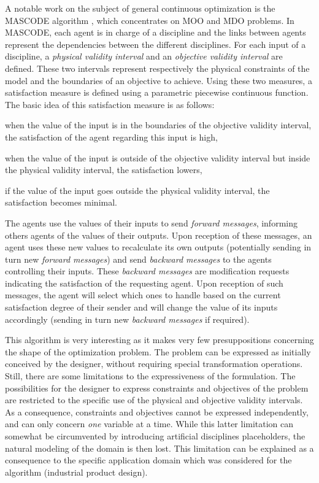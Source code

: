 A notable work on the subject of general continuous optimization is the MASCODE algorithm \cite{welcomme2006self}, which concentrates on MOO and MDO problems. In MASCODE, each agent is in charge of a discipline and the links between agents represent the dependencies between the different disciplines. For each input of a discipline, a \emph{physical validity interval} and an \emph{objective validity interval} are defined. These two intervals represent respectively the physical constraints of the model and the boundaries of an objective to achieve. Using these two measures, a satisfaction measure is defined using a parametric piecewise continuous function. The basic idea of this satisfaction measure is as follows: 
\begin{compactitem}
\item when the value of the input is in the boundaries of the objective validity interval, the satisfaction of the agent regarding this input is high,
\item when the value of the input is outside of the objective validity interval but inside the physical validity interval, the satisfaction lowers,
\item if the value of the input goes outside the physical validity interval, the satisfaction becomes minimal.
\end{compactitem}

The agents use the values of their inputs to send \emph{forward messages}, informing others agents of the values of their outputs. Upon reception of these messages, an agent uses these new values to recalculate its own outputs (potentially sending in turn new \emph{forward messages}) and send \emph{backward messages} to the agents controlling their inputs. These \emph{backward messages} are modification requests indicating the satisfaction of the requesting agent. Upon reception of such messages, the agent will select which ones to handle based on the current satisfaction degree of their sender and will change the value of its inputs accordingly (sending in turn new \emph{backward messages} if required).

This algorithm is very interesting as it makes very few presuppositions concerning the shape of the optimization problem. The problem can be expressed as initially conceived by the designer, without requiring special transformation operations. Still, there are some limitations to the expressiveness of the formulation. The possibilities for the designer to express constraints and objectives of the problem are restricted to the specific use of the physical and objective validity intervals. As a consequence, constraints and objectives cannot be expressed independently, and can only concern \emph{one} variable at a time. While this latter limitation can somewhat be circumvented by introducing artificial disciplines placeholders, the natural modeling of the domain is then lost. This limitation can be explained as a consequence to the specific application domain which was considered for the algorithm (industrial product design).

